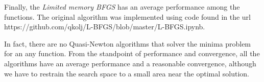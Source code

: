 Finally, the \textit{Limited memory BFGS} has an average performance among the functions. The original algorithm was implemented using code found in the url https://github.com/qkolj/L-BFGS/blob/master/L-BFGS.ipynb.

In fact, there are no Quasi-Newton algorithms that solver the minima problem for an any function. From the standpoint of performance and convergence, all the algorithms have an average performance and a reasonable convergence, although we have to restrain the search space to a small area near the optimal solution.

